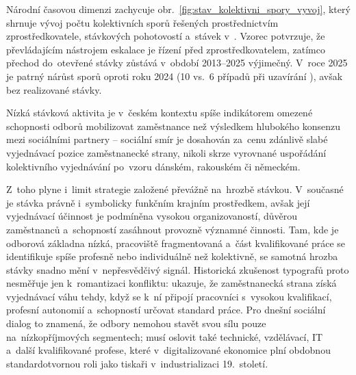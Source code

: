 

Národní časovou dimenzi zachycuje obr.~\ref{fig:stav_kolektivni_spory_vyvoj}, který shrnuje vývoj počtu kolektivních sporů řešených prostřednictvím zprostředkovatele, stávkových pohotovostí a~stávek v~. Vzorec potvrzuje, že převládajícím nástrojem eskalace je řízení před zprostředkovatelem, zatímco přechod do~otevřené stávky zůstává v~období 2013--2025 výjimečný. V~roce 2025 je patrný nárůst sporů oproti roku 2024 (10 vs.~6 případů při uzavírání ), avšak bez realizované stávky.~\cite{CMKOS_ZpravaKV2025}



Nízká stávková aktivita je v~českém kontextu spíše indikátorem omezené schopnosti odborů mobilizovat zaměstnance než výsledkem hlubokého konsenzu mezi sociálními partnery -- sociální smír je dosahován za~cenu zdánlivě slabé vyjednávací pozice zaměstnanecké strany, nikoli skrze vyrovnané uspořádání kolektivního vyjednávání po~vzoru dánském, rakouském či německém.\par

Z~toho plyne i~limit strategie založené převážně na~hrozbě stávkou. V~současné  je stávka právně i~symbolicky funkčním krajním prostředkem, avšak její vyjednávací účinnost je podmíněna vysokou organizovaností, důvěrou zaměstnanců a~schopností zasáhnout provozně významné činnosti. Tam, kde je odborová základna nízká, pracoviště fragmentovaná a~část kvalifikované práce se identifikuje spíše profesně nebo individuálně než kolektivně, se samotná hrozba stávky snadno mění v~nepřesvědčivý signál. Historická zkušenost typografů proto nesměřuje jen k~romantizaci konfliktu: ukazuje, že zaměstnanecká strana získá vyjednávací váhu tehdy, když se k~ní připojí pracovníci s~vysokou kvalifikací, profesní autonomií a~schopností určovat standard práce. Pro dnešní sociální dialog to znamená, že odbory nemohou stavět svou sílu pouze na~nízkopříjmových segmentech; musí oslovit také technické, vzdělávací, IT a~další kvalifikované profese, které v~digitalizované ekonomice plní obdobnou standardotvornou roli jako tiskaři v~industrializaci 19.~století.\par
